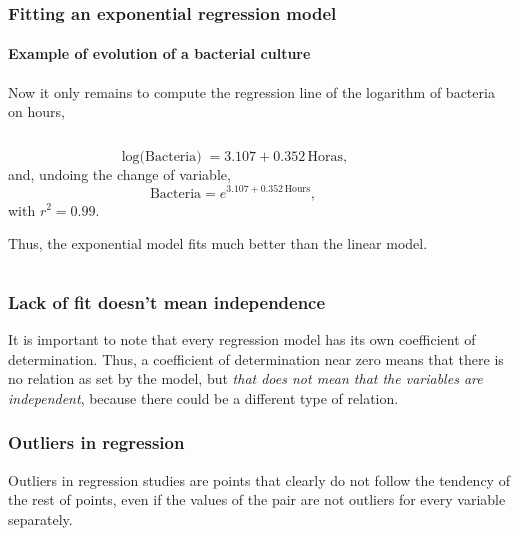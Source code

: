 \begin{frame}
\frametitle{Fitting an exponential regression model}
\framesubtitle{Example of evolution of a bacterial culture}
Now it only remains to compute the regression line of the logarithm of bacteria on hours,
\begin{columns}
\begin{column}{0.45\textwidth}
\[
\mbox{$\log$(Bacteria)} = 3.107 + 0.352\, \mbox{Horas},
\]
and, undoing the change of variable, 
\[
\mbox{Bacteria} = e^{3.107+0.352\,\mbox{Hours}},
\]
with $r^2=0.99$.

Thus, the exponential model fits much better than the linear model. 
\end{column}
\begin{column}{0.55\textwidth}
\begin{center}
\end{center}
\end{column}
\end{columns}
\end{frame}


\begin{frame}
\frametitle{Lack of fit doesn't mean independence}
It is important to note that every regression model has its own coefficient of determination. Thus, a coefficient of determination near zero means that there is no relation as set by the model, but \emph{that does not mean that the variables are independent}, because there could be a different type of relation.
\begin{center}
\resizebox{0.49\textwidth}{!}{}
\resizebox{0.49\textwidth}{!}{}
\end{center}
\end{frame}


\begin{frame}
\frametitle{Outliers in regression}
Outliers in regression studies are points that clearly do not follow the tendency of the rest of points, even if the values of the pair are not outliers for every variable separately.
\begin{center}
\resizebox{0.7\textwidth}{!}{}
\end{center}
\end{frame}


